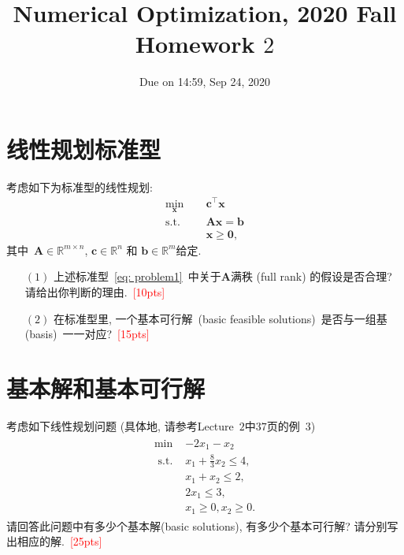 \documentclass[10pt]{article}
\begin{document}
	
\title{	Numerical Optimization, 2020 Fall\\Homework $2$}
\date{Due on 14:59, Sep 24, 2020\\}
\maketitle

\section{线性规划标准型}
考虑如下为标准型的线性规划:
\begin{equation}\label{eq: problem1}
	\begin{aligned}
		\min_{\bm{x}}~\quad&\bm{c}^{\top}\bm{x}\\
		\textrm{s.t.}~\quad&\bm{A}\bm{x} = \bm{b}\\
		&\bm{x}\geq \bm{0},
	\end{aligned}
\end{equation}
其中~$\bm{A}\in\mathbb{R}^{m\times n}$, $\bm{c}\in\mathbb{R}^{n}$ 和 $\bm{b}\in\mathbb{R}^{m}$给定.
\begin{itemize}
	\item[$(1)$] 上述标准型~\eqref{eq: problem1}~中关于$\bm{A}$满秩 (full rank) 的假设是否合理? 请给出你判断的理由.~\textcolor{red}{[10pts]}
	
	\item[$(2)$] 在标准型里, 一个基本可行解~(basic feasible solutions)~是否与一组基 (basis)~一一对应?~\textcolor{red}{[15pts]}
\end{itemize}



\section{基本解和基本可行解} 
考虑如下线性规划问题 (具体地, 请参考Lecture~$2$中$37$页的例~$3$)
\begin{equation}\label{eq: ex3}
	\begin{array}{c}
		\begin{aligned}
			\min~&-2 x_{1}-x_{2} \\
			\textrm { s.t. } &x_{1}+\frac{8}{3} x_{2} \leq 4, \\
			&x_{1}+x_{2} \leq 2, \\
			&2 x_{1} \leq 3, \\
			&x_{1} \geq 0, x_{2} \geq 0.
		\end{aligned}
	\end{array}
\end{equation}
请回答此问题中有多少个基本解(basic solutions), 有多少个基本可行解? 请分别写出相应的解.~\textcolor{red}{[25pts]}
\end{document}
